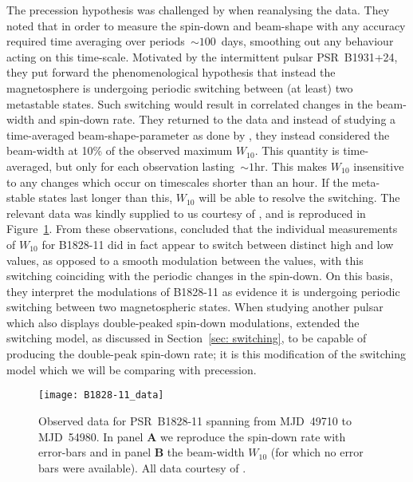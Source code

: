 \documentclass[../full_thesis/full_thesis.tex]{subfiles}
\begin{document}
The precession hypothesis was challenged by \citet{Lyne2010} when reanalysing
the data.   They noted that in order to measure the spin-down and beam-shape
with any accuracy required time averaging over periods~$\sim100$~days,
smoothing out any behaviour acting on this time-scale. Motivated by the
intermittent pulsar PSR~B1931+24, they put forward the phenomenological hypothesis
that instead the magnetosphere is undergoing periodic switching between (at
least) two metastable states. Such switching would result in correlated changes
in the beam-width and spin-down rate. They returned to the data and instead of
studying a time-averaged beam-shape-parameter as done by \citet{Stairs2000},
they instead considered the beam-width at 10\% of the observed maximum
$W_{10}$. This quantity is time-averaged, but only for each observation
lasting~$\sim1$hr. This makes $W_{10}$ insensitive to any changes which occur on
timescales shorter than an hour. If the meta-stable states last longer than
this, $W_{10}$ will be able to resolve the switching. The  relevant data was
kindly supplied to us courtesy of \citet{Lyne2010}, and is reproduced in
Figure~\ref{fig: B1828-11 data}. From these observations,
\citet{Lyne2010} concluded that the individual measurements of $W_{10}$ for
B1828-11 did in fact appear to switch between distinct high and low values, as
opposed to a smooth modulation between the values, with this switching
coinciding with the periodic changes in the spin-down. On this basis, they
interpret the modulations of B1828-11 as evidence it is undergoing periodic
switching between two magnetospheric states. When studying another pulsar which
also displays double-peaked spin-down modulations, \citet{Perera2015} extended
the switching model, as discussed in Section~\ref{sec: switching}, to be capable
of producing the double-peak spin-down rate; it is this modification of the
switching model which we will be comparing with precession.

\begin{figure}
\centering
\texttt{[image: B1828-11\_data]}
\caption{Observed data for PSR~B1828-11 spanning from MJD~49710 to MJD~54980.
         In panel $\textbf{A}$ we reproduce the spin-down rate with error-bars
         and in panel $\textbf{B}$ the beam-width $W_{10}$
          (for which no error bars were available). All data
         courtesy of \citet{Lyne2010}.}
\label{fig: B1828-11 data}
\end{figure}
\end{document}
